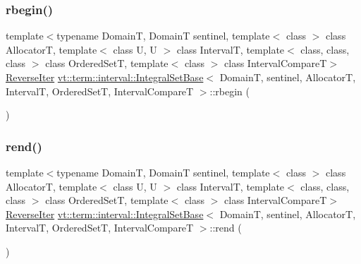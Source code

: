 \mbox{\label{structvt_1_1term_1_1interval_1_1_integral_set_base_ab253d070e9a28940a9b727696b0bb25c}} 
\subsubsection{\texorpdfstring{rbegin()}{rbegin()}}
{\footnotesize\ttfamily template$<$typename DomainT, DomainT sentinel, template$<$ class $>$ class AllocatorT, template$<$ class U, U $>$ class IntervalT, template$<$ class, class, class $>$ class Ordered\+SetT, template$<$ class $>$ class Interval\+CompareT$>$ \\
\hyperlink{structvt_1_1term_1_1interval_1_1_integral_set_base_af36c82de08ca3e67714c9051d9f3db92}{Reverse\+Iter} \hyperlink{structvt_1_1term_1_1interval_1_1_integral_set_base}{vt\+::term\+::interval\+::\+Integral\+Set\+Base}$<$ DomainT, sentinel, AllocatorT, IntervalT, Ordered\+SetT, Interval\+CompareT $>$\+::rbegin (\begin{DoxyParamCaption}{ }\end{DoxyParamCaption})\hspace{0.3cm}{\ttfamily [inline]}}

\mbox{\label{structvt_1_1term_1_1interval_1_1_integral_set_base_ae174160d7537b4c841d71514deb90a89}} 
\subsubsection{\texorpdfstring{rend()}{rend()}}
{\footnotesize\ttfamily template$<$typename DomainT, DomainT sentinel, template$<$ class $>$ class AllocatorT, template$<$ class U, U $>$ class IntervalT, template$<$ class, class, class $>$ class Ordered\+SetT, template$<$ class $>$ class Interval\+CompareT$>$ \\
\hyperlink{structvt_1_1term_1_1interval_1_1_integral_set_base_af36c82de08ca3e67714c9051d9f3db92}{Reverse\+Iter} \hyperlink{structvt_1_1term_1_1interval_1_1_integral_set_base}{vt\+::term\+::interval\+::\+Integral\+Set\+Base}$<$ DomainT, sentinel, AllocatorT, IntervalT, Ordered\+SetT, Interval\+CompareT $>$\+::rend (\begin{DoxyParamCaption}{ }\end{DoxyParamCaption})\hspace{0.3cm}{\ttfamily [inline]}}

